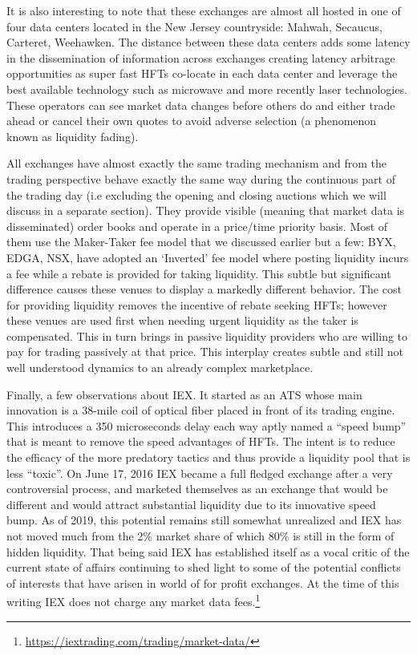 It is also interesting to note that these exchanges are almost all hosted in one of four data centers located in the New Jersey countryside: Mahwah, Secaucus, Carteret, Weehawken. The distance between these data centers adds some latency in the dissemination of information across exchanges creating latency arbitrage opportunities as super fast HFTs co-locate in each data center and leverage the best available technology such as microwave and more recently laser technologies. These operators can see market data changes before others do and either trade ahead or cancel their own quotes to avoid adverse selection (a phenomenon known as liquidity fading).

All exchanges have almost exactly the same trading mechanism and from the trading perspective behave exactly the same way during the continuous part of the trading day (i.e excluding the opening and closing auctions which we will discuss in a separate section). They provide visible (meaning that market data is disseminated) order books and operate in a price/time priority basis. Most of them use the Maker-Taker fee model that we discussed earlier but a few: BYX, EDGA, NSX, have adopted an `Inverted' fee model where posting liquidity incurs a fee while a rebate is provided for taking liquidity. This subtle but significant difference causes these venues to display a markedly different behavior. The cost for providing liquidity removes the incentive of rebate seeking HFTs; however  these venues are used first when needing urgent liquidity as the taker is compensated. This in turn brings in passive liquidity providers who are willing to pay for trading passively at that price. This interplay creates subtle and still not well understood dynamics to an already complex marketplace.

Finally, a few observations about IEX. It started as an ATS whose main innovation is a 38-mile coil of optical fiber placed in front of its trading engine. This introduces a 350 microseconds delay each way aptly named a ``speed bump'' that is meant to remove the speed advantages of HFTs. The intent is to reduce the efficacy of the more predatory tactics and thus provide a liquidity pool that is less ``toxic''. On June 17, 2016 IEX became a full fledged exchange after a very controversial process, and marketed themselves as an exchange that would be different and would attract substantial liquidity due to its innovative speed bump. As of 2019, this potential remains still somewhat unrealized and IEX has not moved much from the 2\% market share of which 80\% is still in the form of hidden liquidity. That being said IEX has established itself as a vocal critic of the current state of affairs continuing to shed light to some of the potential conflicts of interests that have arisen in world of for profit exchanges. At the time of this writing IEX does not charge any market data fees.\footnote{\url{https://iextrading.com/trading/market-data/}} \twomedskip

